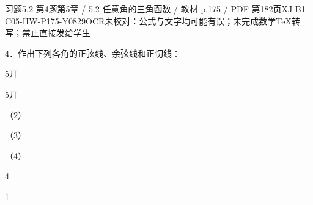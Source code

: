 \begin{bankitem}{习题5.2 第4题}{第5章 / 5.2 任意角的三角函数 / 教材 p.175 / PDF 第182页}{XJ-B1-C05-HW-P175-Y0829}{OCR未校对：公式与文字均可能有误；未完成数学TeX转写；禁止直接发给学生}
\begin{ocrdraft}
\par
4．作出下列各角的正弦线、余弦线和正切线：
\par
5丌
\par
5丌
\par
（2）
\par
（3）
\par
（4）
\par
4
\par
1
\end{ocrdraft}
\end{bankitem}
